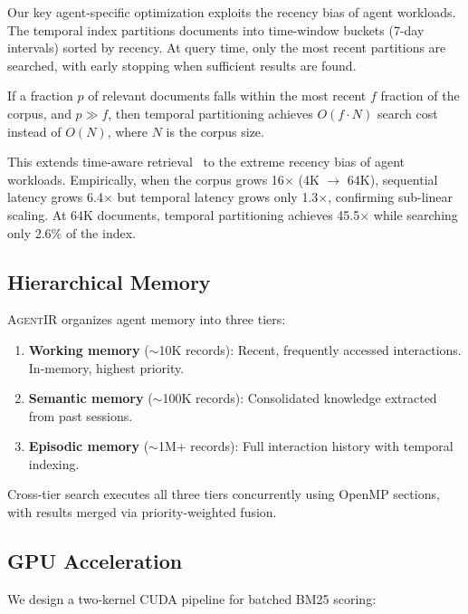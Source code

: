 \documentclass[sigconf,nonacm,anonymous]{acmart}
\newcommand{\sysname}{\textsc{AgentIR}}
\newcommand{\speedup}[1]{#1$\times$}
\begin{document}
Our key agent-specific optimization exploits the recency bias of
agent workloads.  The temporal index partitions documents into
time-window buckets (7-day intervals) sorted by recency.  At
query time, only the most recent partitions are searched, with
early stopping when sufficient results are found.

\begin{theorem}
If a fraction $p$ of relevant documents falls within the most
recent $f$ fraction of the corpus, and $p \gg f$, then temporal
partitioning achieves $O(f \cdot N)$ search cost instead of $O(N)$,
where $N$ is the corpus size.
\end{theorem}

This extends time-aware retrieval~\cite{li2003temporal,campos2014temporal_survey}
to the extreme recency bias of agent workloads.  Empirically, when the
corpus grows 16$\times$ (4K $\to$ 64K), sequential latency grows
6.4$\times$ but temporal latency grows only 1.3$\times$, confirming
sub-linear scaling.  At 64K documents, temporal partitioning achieves
\speedup{45.5} while searching only 2.6\% of the index.

\subsection{Hierarchical Memory}
\label{sec:hierarchical}

\sysname{} organizes agent memory into three tiers:

\begin{enumerate}
\item \textbf{Working memory} ($\sim$10K records): Recent, frequently
  accessed interactions. In-memory, highest priority.
\item \textbf{Semantic memory} ($\sim$100K records): Consolidated
  knowledge extracted from past sessions.
\item \textbf{Episodic memory} ($\sim$1M+ records): Full interaction
  history with temporal indexing.
\end{enumerate}

Cross-tier search executes all three tiers concurrently using
OpenMP sections, with results merged via priority-weighted fusion.

\subsection{GPU Acceleration}
\label{sec:gpu}

We design a two-kernel CUDA pipeline for batched BM25 scoring:
\end{document}
